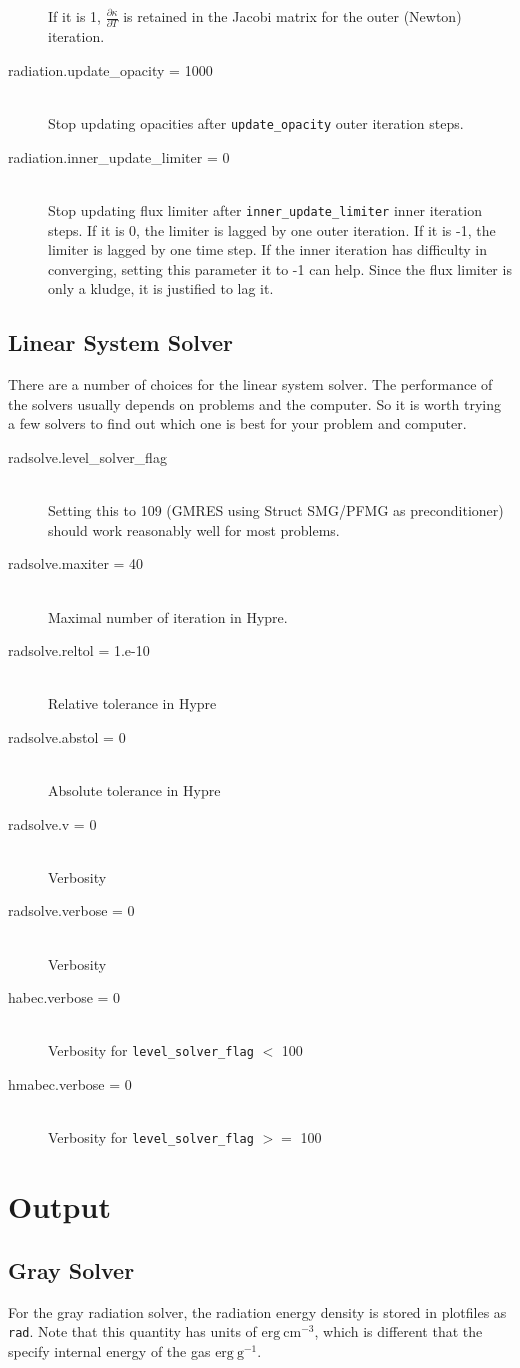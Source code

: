 \documentclass[11pt,letterpaper]{article}
\begin{document}
\begin{description}
  If it is 1, $\frac{\partial \kappa}{\partial T}$ is retained in the
  Jacobi matrix for the outer (Newton) iteration.
\item[radiation.update\_opacity = 1000] \hfill \\
  Stop updating opacities after {\tt update\_opacity} outer iteration steps.
\item[radiation.inner\_update\_limiter = 0] \hfill \\
  Stop updating flux limiter after {\tt inner\_update\_limiter} inner
  iteration steps.  If it is 0, the limiter is lagged by one outer
  iteration.  If it is -1, the limiter is lagged by one time step.  If
  the inner iteration has difficulty in converging, setting this
  parameter it to -1 can help.  Since the flux limiter is only a
  kludge, it is justified to lag it.
\end{description}


\subsection{Linear System Solver}
\label{sec:hypre}

There are a number of choices for the linear system solver.  The
performance of the solvers usually depends on problems and the
computer.  So it is worth trying a few solvers to find out which one
is best for your problem and computer.

\begin{description}
\item[radsolve.level\_solver\_flag] \hfill \\
  Setting this to 109 (GMRES using Struct SMG/PFMG as preconditioner)
  should work reasonably well for most problems.
\item[radsolve.maxiter = 40] \hfill \\
  Maximal number of iteration in Hypre.
\item[radsolve.reltol = 1.e-10] \hfill \\
  Relative tolerance in Hypre
\item[radsolve.abstol = 0] \hfill \\
  Absolute tolerance in Hypre
\item[radsolve.v = 0] \hfill \\
  Verbosity
\item[radsolve.verbose = 0] \hfill \\
  Verbosity
\item[habec.verbose = 0] \hfill \\
  Verbosity for {\tt level\_solver\_flag} $<$ 100
\item[hmabec.verbose = 0] \hfill \\
  Verbosity for {\tt level\_solver\_flag} $>=$ 100
\end{description}


\section{Output}

\subsection{Gray Solver}

For the gray radiation solver, the radiation energy density is stored in plotfiles
as {\tt rad}.  Note that this quantity has units of $\mathrm{erg~cm^{-3}}$, which
is different that the specify internal energy of the gas $\mathrm{erg~g^{-1}}$.
\end{document}
